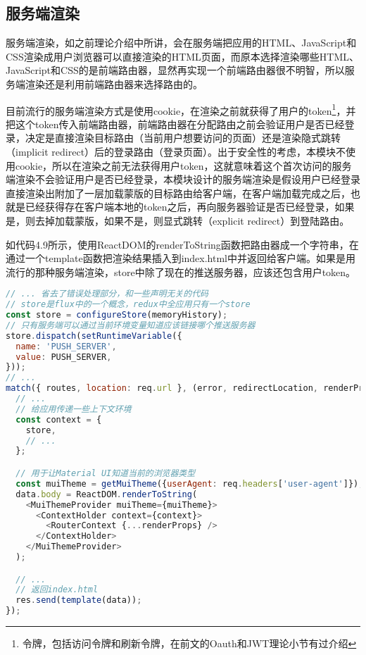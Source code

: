\subsection{服务端渲染}
服务端渲染，如之前理论介绍中所讲，会在服务端把应用的HTML、JavaScript和CSS渲染成用户浏览器可以直接渲染的HTML页面，而原本选择渲染哪些HTML、JavaScript和CSS的是前端路由器，显然再实现一个前端路由器很不明智，所以服务端渲染还是利用前端路由器来选择路由的。

目前流行的服务端渲染方式是使用cookie，在渲染之前就获得了用户的token\footnote{令牌，包括访问令牌和刷新令牌，在前文的Oauth和JWT理论小节有过介绍}，并把这个token传入前端路由器，前端路由器在分配路由之前会验证用户是否已经登录，决定是直接渲染目标路由（当前用户想要访问的页面）还是渲染隐式跳转（implicit redirect）后的登录路由（登录页面）。出于安全性的考虑，本模块不使用cookie，所以在渲染之前无法获得用户token，这就意味着这个首次访问的服务端渲染不会验证用户是否已经登录，本模块设计的服务端渲染是假设用户已经登录直接渲染出附加了一层加载蒙版的目标路由给客户端，在客户端加载完成之后，也就是已经获得存在客户端本地的token之后，再向服务器验证是否已经登录，如果是，则去掉加载蒙版，如果不是，则显式跳转（explicit redirect）到登陆路由。

如代码4.9所示，使用ReactDOM的renderToString函数把路由器成一个字符串，在通过一个template函数把渲染结果插入到index.html中并返回给客户端。如果是用流行的那种服务端渲染，store中除了现在的推送服务器，应该还包含用户token。
\begin{lstlisting}[language={JavaScript}, caption={服务端渲染样例代码}]
// ... 省去了错误处理部分，和一些声明无关的代码
// store是flux中的一个概念，redux中全应用只有一个store
const store = configureStore(memoryHistory);
// 只有服务端可以通过当前环境变量知道应该链接哪个推送服务器
store.dispatch(setRuntimeVariable({
  name: 'PUSH_SERVER',
  value: PUSH_SERVER,
}));
// ...
match({ routes, location: req.url }, (error, redirectLocation, renderProps) => {
  // ...
  // 给应用传递一些上下文环境
  const context = {
    store,
    // ...
  };

  // 用于让Material UI知道当前的浏览器类型
  const muiTheme = getMuiTheme({userAgent: req.headers['user-agent']});
  data.body = ReactDOM.renderToString(
    <MuiThemeProvider muiTheme={muiTheme}>
      <ContextHolder context={context}>
        <RouterContext {...renderProps} />
      </ContextHolder>
    </MuiThemeProvider>
  );

  // ...
  // 返回index.html
  res.send(template(data));
});
\end{lstlisting}

